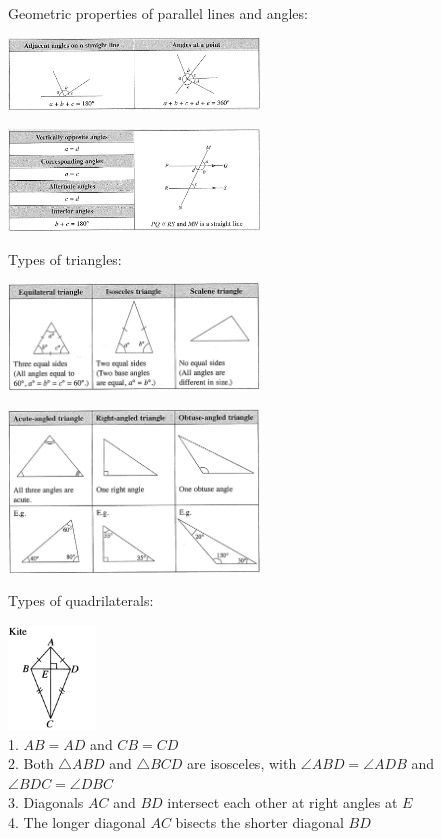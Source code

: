 \documentclass[twocolumn]{article}
\begin{document}
\begin{enumerate}
\noindent
Geometric properties of parallel lines and angles:

\includegraphics[width=0.5\textwidth]{20.png}

\includegraphics[width=0.5\textwidth]{21.png}

Types of triangles:

\includegraphics[width=0.5\textwidth]{23.png}

\includegraphics[width=0.5\textwidth]{24.png}

\noindent
Types of quadrilaterals:

\includegraphics[width=0.175\textwidth]{32.png} \\
1. $AB=AD$ and $CB=CD$ \\
2. Both $\triangle A B D$ and $\triangle B C D$ are isosceles, with $\angle A B D=\angle A D B$ and $\angle B D C=\angle D B C$ \\
3. Diagonals $A C$ and $B D$ intersect each other at right angles at $E$ \\
4. The longer diagonal $A C$ bisects the shorter diagonal $B D$ 


\end{enumerate}
\end{document}
